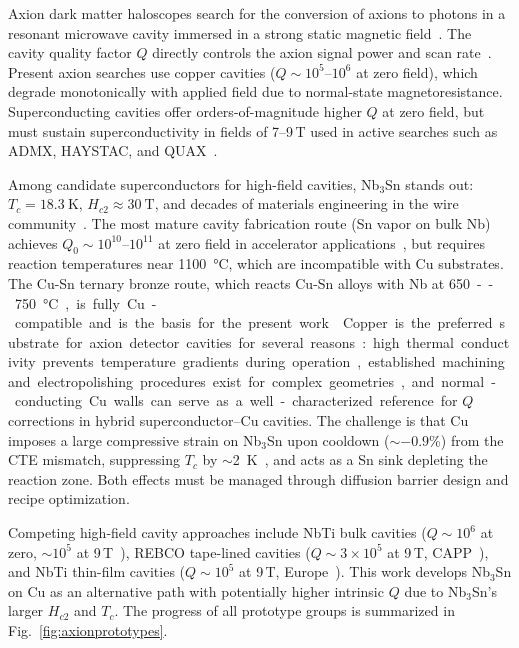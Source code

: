 \documentclass{iopjournal}
\begin{document}
Axion dark matter haloscopes search for the conversion of axions to photons in a resonant microwave cavity immersed in a strong static magnetic field~\cite{ADMX:2009iij}. The cavity quality factor $Q$ directly controls the axion signal power and scan rate~\cite{Braine:2024nzi}. Present axion searches use copper cavities ($Q \sim 10^5$--$10^6$ at zero field), which degrade monotonically with applied field due to normal-state magnetoresistance. Superconducting cavities offer orders-of-magnitude higher $Q$ at zero field, but must sustain superconductivity in fields of 7--9\,T used in active searches such as ADMX, HAYSTAC, and QUAX~\cite{ADMX:2009iij, Braine:2022qal, FirstQUAXGalactic2020}.

Among candidate superconductors for high-field cavities, Nb$_3$Sn stands out: $T_c = \qty{18.3}{\kelvin}$, $H_{c2} \approx \qty{30}{\tesla}$, and decades of materials engineering in the wire community~\cite{gurevichUseNotUse2011, ambrosioNb3SnHighField2015}. The most mature cavity fabrication route (Sn vapor on bulk Nb) achieves $Q_0 \sim 10^{10}$--$10^{11}$ at zero field in accelerator applications~\cite{Posen:2018zjb}, but requires reaction temperatures near \qty{1100}{\degreeCelsius}, which are incompatible with Cu substrates. The Cu-Sn ternary bronze route, which reacts Cu-Sn alloys with Nb at \qty{650}--\qty{750}{\degreeCelsius}, is fully Cu-compatible and is the basis for the present work~\cite{withanageRapidNbSn2021}.

Copper is the preferred substrate for axion detector cavities for several reasons: high thermal conductivity prevents temperature gradients during operation, established machining and electropolishing procedures exist for complex geometries, and normal-conducting Cu walls can serve as a well-characterized reference for $Q$ corrections in hybrid superconductor--Cu cavities. The challenge is that Cu imposes a large compressive strain on Nb$_3$Sn upon cooldown ($\sim -0.9$\%) from the CTE mismatch, suppressing $T_c$ by $\sim$\qty{2}{\kelvin}~\cite{ekinStrainScalingLaw1980}, and acts as a Sn sink depleting the reaction zone. Both effects must be managed through diffusion barrier design and recipe optimization.

Competing high-field cavity approaches include NbTi bulk cavities ($Q \sim 10^6$ at zero, $\sim 10^5$ at 9\,T~\cite{Braine:2022qal}), REBCO tape-lined cavities ($Q \sim 3 \times 10^5$ at 9\,T, CAPP~\cite{ahnSuperconductingCavityHigh2020}), and NbTi thin-film cavities ($Q \sim 10^5$ at 9\,T, Europe~\cite{Alesini:2019ajt}). This work develops Nb$_3$Sn on Cu as an alternative path with potentially higher intrinsic $Q$ due to Nb$_3$Sn's larger $H_{c2}$ and $T_c$. The progress of all prototype groups is summarized in Fig.~\ref{fig:axionprototypes}.
\end{document}
